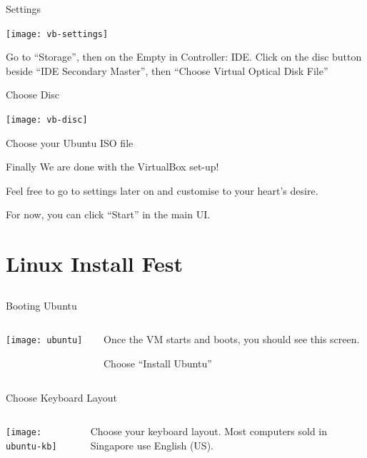 \documentclass[12pt]{beamer}
\begin{document}
\begin{frame}{Settings}
  \begin{center}
    \texttt{[image: vb-settings]}
  \end{center}
  Go to ``Storage'', then on the Empty in Controller: IDE. Click on the disc button beside ``IDE Secondary Master'', then ``Choose Virtual Optical Disk File''
\end{frame}

\begin{frame}{Choose Disc}
  \begin{center}
    \texttt{[image: vb-disc]}
  \end{center}
  Choose your Ubuntu ISO file
\end{frame}

\begin{frame}{Finally}
  We are done with the VirtualBox set-up!

  Feel free to go to settings later on and customise to your heart's desire.

  For now, you can click ``Start'' in the main UI.
\end{frame}

\section{Linux Install Fest}
\subsection{}

\begin{frame}{Booting Ubuntu}
  \begin{columns}
    \begin{column}{0.65\linewidth}
      \texttt{[image: ubuntu]}
    \end{column}
    \begin{column}{0.35\linewidth}
      Once the VM starts and boots, you should see this screen.

      Choose ``Install Ubuntu''
    \end{column}
  \end{columns}
\end{frame}

\begin{frame}{Choose Keyboard Layout}
  \begin{columns}
    \begin{column}{0.65\linewidth}
      \texttt{[image: ubuntu-kb]}
    \end{column}
    \begin{column}{0.35\linewidth}
      Choose your keyboard layout. Most computers sold in Singapore use English (US).
    \end{column}
  \end{columns}
\end{frame}
\end{document}
